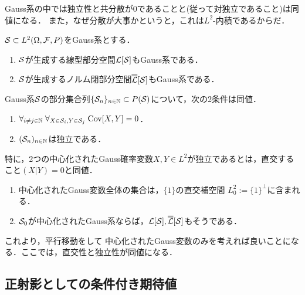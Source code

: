 \documentclass[uplatex,dvipdfmx]{jsreport}
\begin{document}
\begin{tcolorbox}[colframe=ForestGreen, colback=ForestGreen!10!white,breakable,colbacktitle=ForestGreen!40!white,coltitle=black,fonttitle=\bfseries\sffamily,
title=]
    Gauss系の中では独立性と共分散が$0$であることと(従って対独立であること)は同値になる．
    また，なぜ分散が大事かというと，これは$L^2$-内積であるからだ．
\end{tcolorbox}

\begin{lemma}[Gauss部分空間]
    $\S\subset L^2(\Om,\F,P)$をGauss系とする．
    \begin{enumerate}
        \item $\S$が生成する線型部分空間$\L[\S]$もGauss系である．
        \item $\S$が生成するノルム閉部分空間$\oo{\L}[\S]$もGauss系である．
    \end{enumerate}
\end{lemma}

\begin{theorem}[独立性の特徴付け]
    Gauss系$\S$の部分集合列$\{\S_n\}_{n\in\N}\subset P(\S)$について，次の2条件は同値．
    \begin{enumerate}
        \item $\forall_{i\ne j\in\N}\;\forall_{X\in\S_i,Y\in\S_j}\;\Cov[X,Y]=0$．
        \item $(\S_n)_{n\in\N}$は独立である．
    \end{enumerate}
    特に，2つの中心化されたGauss確率変数$X,Y\in L^2$が独立であるとは，直交すること$(X|Y)=0$と同値．
\end{theorem}

\begin{lemma}[中心化されたGauss変数の性質]\mbox{}
    \begin{enumerate}
        \item 中心化されたGauss変数全体の集合は，$\{1\}$の直交補空間
        $L_0^2:=\{1\}^\perp$に含まれる．
        \item $\S_0$が中心化されたGauss系ならば，$\L[\S],\oo{\L}[\S]$もそうである．
    \end{enumerate}
\end{lemma}
\begin{remarks}
    これより，平行移動をして
    中心化されたGauss変数のみを考えれば良いことになる．ここでは，直交性と独立性が同値になる．
\end{remarks}

\subsection{正射影としての条件付き期待値}
\end{document}
